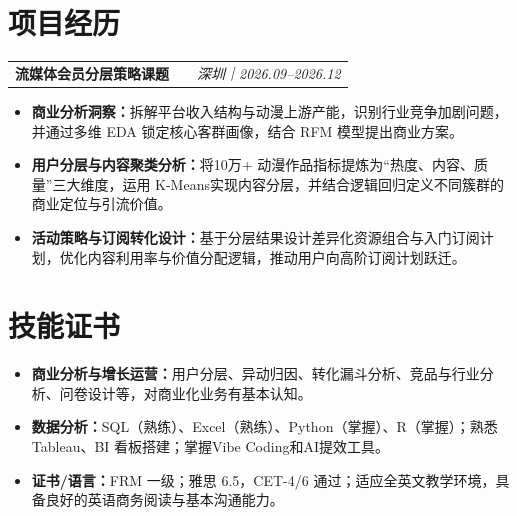 \documentclass[10pt, a4paper]{article}
\makeatletter
\newcommand{\resumeEntry}[4]{
  \vspace{3.5pt}
  \noindent
  {\normalsize
  \begin{tabular*}{\textwidth}{@{}p{0.33\textwidth}@{\extracolsep{\fill}}>{\centering\arraybackslash}p{0.34\textwidth}>{\raggedleft\arraybackslash}p{0.33\textwidth}@{}}
    \textbf{#1} & \textbf{#3} & {\small\textit{#2｜#4}}
  \end{tabular*}\par}
  \vspace{1pt}
}
\makeatother
\begin{document}
\section{项目经历}

\resumeEntry{流媒体会员分层策略课题}{深圳}{ }{2026.09--2026.12}
\begin{itemize}
    \item \textbf{商业分析洞察：}拆解平台收入结构与动漫上游产能，识别行业竞争加剧问题，并通过多维 EDA 锁定核心客群画像，结合 RFM 模型提出商业方案。
    \item \textbf{用户分层与内容聚类分析：}将10万+ 动漫作品指标提炼为“热度、内容、质量”三大维度，运用 K-Means实现内容分层，并结合逻辑回归定义不同簇群的商业定位与引流价值。
    \item \textbf{活动策略与订阅转化设计：}基于分层结果设计差异化资源组合与入门订阅计划，优化内容利用率与价值分配逻辑，推动用户向高阶订阅计划跃迁。
\end{itemize}

\section{技能证书}
\begin{itemize}
    \item \textbf{商业分析与增长运营：}用户分层、异动归因、转化漏斗分析、竞品与行业分析、问卷设计等，对商业化业务有基本认知。
    \item \textbf{数据分析：}SQL（熟练）、Excel（熟练）、Python（掌握）、R（掌握）；熟悉 Tableau、BI 看板搭建；掌握Vibe Coding和AI提效工具。
    \item \textbf{证书/语言：}FRM 一级；雅思 6.5，CET-4/6 通过；适应全英文教学环境，具备良好的英语商务阅读与基本沟通能力。
\end{itemize}
\end{document}
